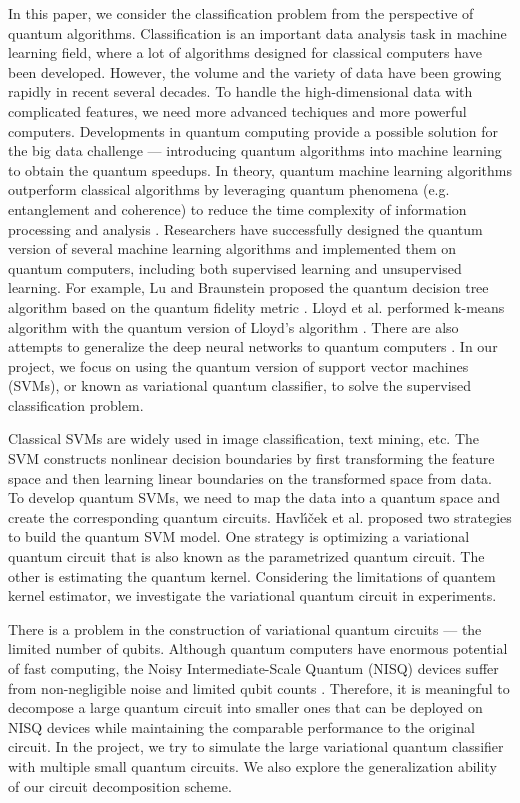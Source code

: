 \documentclass[sigconf]{acmart}
\begin{document}
In this paper, we consider the classification problem from the perspective of quantum algorithms. Classification is an important data analysis task in machine learning field, where a lot of algorithms designed for classical computers have been developed. However, the volume and the variety of data have been growing rapidly in recent several decades. To handle the high-dimensional data with complicated features, we need more advanced techiques and more powerful computers. Developments in quantum computing provide a possible solution for the big data challenge --- introducing quantum algorithms into machine learning to obtain the quantum speedups. In theory, quantum machine learning algorithms outperform classical algorithms by leveraging quantum phenomena (e.g. entanglement and coherence) to reduce the time complexity of information processing and analysis \cite{biamonte2017}. Researchers have successfully designed the quantum version of several machine learning algorithms and implemented them on quantum computers, including both supervised learning and unsupervised learning. For example, Lu and Braunstein proposed the quantum decision tree algorithm based on the quantum fidelity metric \cite{lu2013}. Lloyd et al. performed k-means algorithm with the quantum version of Lloyd’s algorithm \cite{lloyd2013}. There are also attempts to generalize the deep neural networks to quantum computers \cite{qnn2018}. In our project, we focus on using the quantum version of support vector machines (SVMs), or known as variational quantum classifier, to solve the supervised classification problem.

Classical SVMs are widely used in image classification, text mining, etc. The SVM constructs nonlinear decision boundaries by first transforming the feature space and then learning linear boundaries on the transformed space from data. To develop quantum SVMs, we need to map the data into a quantum space and create the corresponding quantum circuits. Havl{\'\i}{\v{c}}ek et al. \cite{havlivcek2019supervised} proposed two strategies to build the quantum SVM model. One strategy is optimizing a variational quantum circuit that is also known as the parametrized quantum circuit. The other is estimating the quantum kernel. Considering the limitations of quantem kernel estimator, we investigate the variational quantum circuit in experiments.

There is a problem in the construction of variational quantum circuits --- the limited number of qubits. Although quantum computers have enormous potential of fast computing, the Noisy Intermediate-Scale Quantum (NISQ) devices suffer from non-negligible noise and limited qubit counts \cite{tang2021}. Therefore, it is meaningful to decompose a large quantum circuit into smaller ones that can be deployed on NISQ devices while maintaining the comparable performance to the original circuit. In the project, we try to simulate the large variational quantum classifier with multiple small quantum circuits. We also explore the generalization ability of our circuit decomposition scheme.
\end{document}
